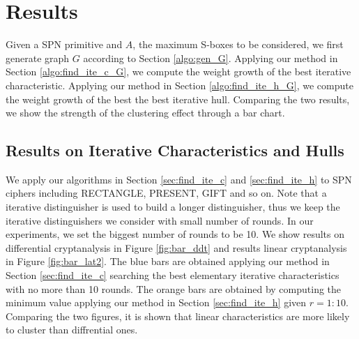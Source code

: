 \section{Results}\label{sec:result}

Given a SPN primitive and $A$, the maximum S-boxes to be considered, we first generate graph $G$ according to Section \ref{algo:gen_G}. Applying our method in Section \ref{algo:find_ite_c_G}, we compute the weight growth of the best iterative characteristic. Applying our method in Section \ref{algo:find_ite_h_G}, we compute the weight growth of the best the best iterative hull. Comparing the two results, we show the strength of the clustering effect through a bar chart. 

\subsection{Results on Iterative Characteristics and Hulls}

We apply our algorithms in Section \ref{sec:find_ite_c} and \ref{sec:find_ite_h} to SPN ciphers including RECTANGLE, PRESENT, GIFT and so on. Note that a iterative distinguisher is used to build a longer distinguisher, thus we keep the iterative distinguishers we consider with small number of rounds. In our experiments, we set the biggest number of rounds to be 10. We show results on differential cryptanalysis in Figure \ref{fig:bar_ddt} and results linear cryptanalysis in Figure \ref{fig:bar_lat2}. The blue bars are obtained applying our method in Section \ref{sec:find_ite_c} searching the best elementary iterative characteristics with no more than 10 rounds. The orange bars are obtained by computing the minimum value applying our method in Section \ref{sec:find_ite_h} given $r=1:10$. Comparing the two figures, it is shown that linear characteristics are more likely to cluster than diffrential ones. 

